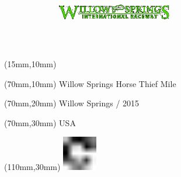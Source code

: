 \null\newpage
\begin{textblock*}{50mm}(15mm,10mm)%
\includegraphics[width=50mm]{LG/WIS.png}
\end{textblock*}
\begin{textblock*}{130mm}(70mm,10mm)%
{\fontsize{20}{20}\selectfont Willow Springs Horse Thief Mile}\\
\end{textblock*}
\begin{textblock*}{120mm}(70mm,20mm)%
{\fontsize{16}{16}\selectfont Willow Springs / 2015}\\
\end{textblock*}
\begin{textblock*}{120mm}(70mm,30mm)%
{\fontsize{12}{12}\selectfont USA}
\end{textblock*}
\begin{textblock*}{30mm}(110mm,30mm)%
\centering
\includegraphics[height=15mm]{icons/fa-rotate-right.pdf}
\end{textblock*}
